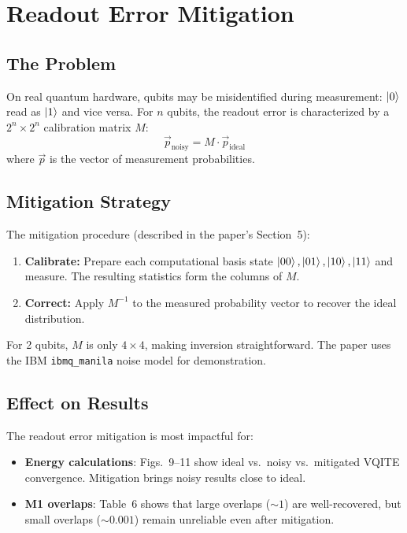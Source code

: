 \documentclass[11pt,a4paper]{article}
\begin{document}
\section{Readout Error Mitigation}

\subsection{The Problem}

On real quantum hardware, qubits may be misidentified during measurement: $\ket{0}$ read as $\ket{1}$ and vice versa. For $n$ qubits, the readout error is characterized by a $2^n \times 2^n$ calibration matrix $M$:
\begin{equation}
  \vec{p}_{\text{noisy}} = M \cdot \vec{p}_{\text{ideal}}
\end{equation}
where $\vec{p}$ is the vector of measurement probabilities.

\subsection{Mitigation Strategy}

The mitigation procedure (described in the paper's Section~5):
\begin{enumerate}[nosep]
  \item \textbf{Calibrate:} Prepare each computational basis state $\ket{00}, \ket{01}, \ket{10}, \ket{11}$ and measure. The resulting statistics form the columns of $M$.
  \item \textbf{Correct:} Apply $M^{-1}$ to the measured probability vector to recover the ideal distribution.
\end{enumerate}

For 2 qubits, $M$ is only $4 \times 4$, making inversion straightforward. The paper uses the IBM \texttt{ibmq\_manila} noise model for demonstration.

\subsection{Effect on Results}

The readout error mitigation is most impactful for:
\begin{itemize}[nosep]
  \item \textbf{Energy calculations}: Figs.~9--11 show ideal vs.\ noisy vs.\ mitigated VQITE convergence. Mitigation brings noisy results close to ideal.
  \item \textbf{M1 overlaps}: Table~6 shows that large overlaps ($\sim 1$) are well-recovered, but small overlaps ($\sim 0.001$) remain unreliable even after mitigation.
\end{itemize}
\end{document}
